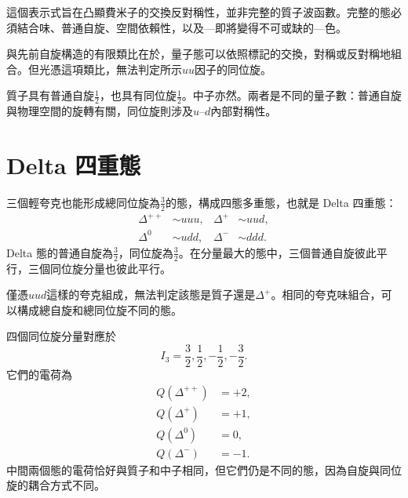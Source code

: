 這個表示式旨在凸顯費米子的交換反對稱性，並非完整的質子波函數。完整的態必須結合味、普通自旋、空間依賴性，以及---即將變得不可或缺的---色。


與先前自旋構造的有限類比在於，量子態可以依照標記的交換，對稱或反對稱地組合。但光憑這項類比，無法判定所示\(uu\)因子的同位旋。

質子具有普通自旋\(\tfrac12\)，也具有同位旋\(\tfrac12\)。中子亦然。兩者是不同的量子數：普通自旋與物理空間的旋轉有關，同位旋則涉及\(u\)--\(d\)內部對稱性。

\section{Delta 四重態}

三個輕夸克也能形成總同位旋為\(\tfrac32\)的態，構成四態多重態，也就是 Delta 四重態：
\begin{equation}
\begin{aligned}
\Delta^{++}&\sim uuu,
&
\Delta^{+}&\sim uud,
\\
\Delta^{0}&\sim udd,
&
\Delta^{-}&\sim ddd.
\end{aligned}
\end{equation}
Delta 態的普通自旋為\(\tfrac32\)，同位旋為\(\tfrac32\)。在分量最大的態中，三個普通自旋彼此平行，三個同位旋分量也彼此平行。

僅憑\(uud\)這樣的夸克組成，無法判定該態是質子還是\(\Delta^+\)。相同的夸克味組合，可以構成總自旋和總同位旋不同的態。

\begin{classroomqa}
\end{classroomqa}

\begin{classroomqa}
\end{classroomqa}

四個同位旋分量對應於
\begin{equation}
I_3=\frac32,\frac12,-\frac12,-\frac32.
\end{equation}
它們的電荷為
\begin{align}
Q(\Delta^{++})&=+2,\\
Q(\Delta^{+})&=+1,\\
Q(\Delta^{0})&=0,\\
Q(\Delta^{-})&=-1.
\end{align}
中間兩個態的電荷恰好與質子和中子相同，但它們仍是不同的態，因為自旋與同位旋的耦合方式不同。

